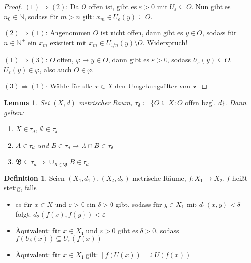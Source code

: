 \documentclass[12pt]{scrartcl}%
\newtheorem{lemma}{Lemma}
\theoremstyle{definition}
\newtheorem*{defn}{Definition}
\theoremstyle{remark}
\newcommand{\implies}{\Rightarrow}
\begin{document}
\begin{proof}
    $(1)\implies (2)$: Da $O$ offen ist, gibt es $\varepsilon > 0$ mit $U_\varepsilon \subseteq O$. Nun gibt es $n_0\in\mathbb{N}$, sodass für $m > n$ gilt: $x_m \in U_\varepsilon(y)\subseteq O$.

    $(2) \implies (1)$: Angenommen $O$ ist nicht offen, dann gibt es $y\in O$, sodass für $n\in \mathbb{N}^+$ ein $x_m$ existiert mit $x_m\in U_{1/n}(y)\setminus O$. Widerspruch!

    $(1) \implies (3)$: $O$ offen, $\varphi \to y\in O$, dann gibt es $\varepsilon > 0$, sodass $U_\varepsilon(y) \subseteq O$. $U_\varepsilon(y)\in\varphi$, also auch $O\in\varphi$.

    $(3) \implies (1)$: Wähle für alle $x\in X$ den Umgebungsfilter von $x$.
\end{proof}

\begin{lemma}
    Sei $(X, d)$ metrischer Raum, $\tau_d\coloneqq \{O\subseteq X: O \text{ offen bzgl. } d\}$. Dann gelten:

    \begin{enumerate}[label=(\arabic*)]
        \item $X\in \tau_d$, $\emptyset\in \tau_d$
        \item $A\in \tau_d$ und $B\in \tau_d \implies A\cap B\in \tau_d$
        \item $\mathfrak{B} \subseteq \tau_d \implies \cup_{B\in\mathfrak{B}} B \in \tau_d$
    \end{enumerate}
\end{lemma}

\begin{defn}
    Seien $(X_1, d_1), (X_2, d_2)$ metrische Räume, $f: X_1\to X_2$. $f$ heißt \underline{stetig}, falls 
    
    \begin{itemize}
        \item es für $x\in X$ und $\varepsilon > 0$ ein $\delta > 0$ gibt, sodass für $y\in X_1$ mit $d_1(x,y) < \delta$ folgt: $d_2(f(x),f(y)) < \varepsilon$

        \item Äquivalent: für $x\in X_1$ und $\varepsilon > 0$ gibt es $\delta > 0$, sodass $f(U_\delta(x)) \subseteq U_\varepsilon(f(x))$

        \item Äquivalent: für $x\in X_1$ gilt: $[f(\underline{U}(x))] \supseteq \underline{U}(f(x))$
    \end{itemize}
\end{defn}
\end{document}
